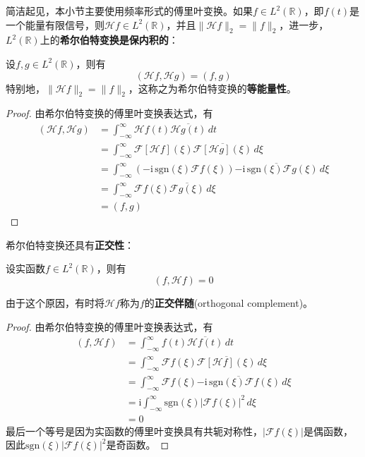 简洁起见，本小节主要使用频率形式的傅里叶变换。如果$f\in L^2(\mathbb{R})$，即$f(t)$是一个能量有限信号，则$\mathcal{H} f\in L^2(\mathbb{R})$，并且$\|\mathcal{H} f\|_2=\|f\|_2$，进一步，$L^2(\mathbb{R})$上的\textbf{希尔伯特变换是保内积的}：
\begin{theorem}
    设$f,g\in L^2(\mathbb{R})$，则有
    \[(\mathcal{H} f,\mathcal{H} g)=(f,g)\]
    特别地，$\|\mathcal{H} f\|_2=\|f\|_2$，这称之为希尔伯特变换的\textbf{等能量性}。
\end{theorem}
\begin{proof}
    由希尔伯特变换的傅里叶变换表达式，有
    \begin{align*}
        (\mathcal{H} f,\mathcal{H} g)&=\int_{-\infty}^{\infty}\mathcal{H} f(t)\overline{\mathcal{H} g(t)}\,dt\\
        &=\int_{-\infty}^{\infty}\mathcal{F} [\mathcal{H} f](\xi)\overline{\mathcal{F} [\mathcal{H} g](\xi)}\,d\xi\\
        &=\int_{-\infty}^{\infty}(-\mathrm{i}\,\text{sgn}(\xi)\mathcal{F} f(\xi))\overline{-\mathrm{i}\,\text{sgn}(\xi)\mathcal{F} g(\xi)}\,d\xi\\
        &=\int_{-\infty}^{\infty}\mathcal{F} f(\xi)\overline{\mathcal{F} g(\xi)}\,d\xi\\
        &=(f,g)
    \end{align*}
\end{proof}

希尔伯特变换还具有\textbf{正交性}：
\begin{theorem}
    设实函数$f\in L^2(\mathbb{R})$，则有
    \[(f,\mathcal{H} f)=0\]
\end{theorem}
由于这个原因，有时将$\mathcal{H} f$称为$f$的\textbf{正交伴随}(orthogonal complement)。
\begin{proof}
    由希尔伯特变换的傅里叶变换表达式，有
    \begin{align*}
        (f,\mathcal{H} f)&=\int_{-\infty}^{\infty}f(t)\overline{\mathcal{H} f(t)}\,dt\\
        &=\int_{-\infty}^{\infty}\mathcal{F} f(\xi)\overline{\mathcal{F} [\mathcal{H} f](\xi)}\,d\xi\\
        &=\int_{-\infty}^{\infty}\mathcal{F} f(\xi)\overline{-\mathrm{i}\,\text{sgn}(\xi)\mathcal{F} f(\xi)}\,d\xi\\
        &=\mathrm{i}\int_{-\infty}^{\infty}\text{sgn}(\xi)|\mathcal{F} f(\xi)|^2\,d\xi\\
        &=0
    \end{align*}
    最后一个等号是因为实函数的傅里叶变换具有共轭对称性，$|\mathcal{F} f(\xi)|$是偶函数，因此$\text{sgn}(\xi)|\mathcal{F} f(\xi)|^2$是奇函数。
\end{proof}


